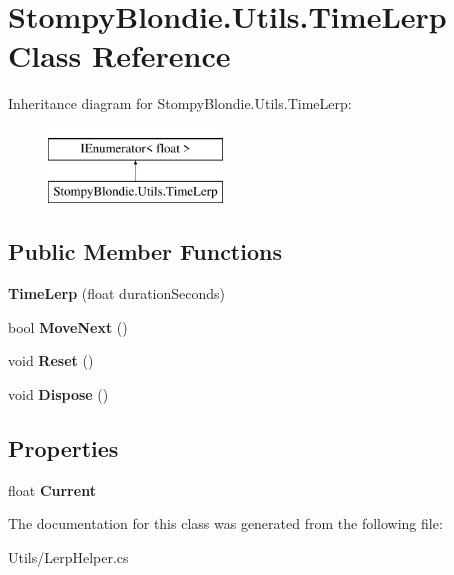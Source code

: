 \hypertarget{class_stompy_blondie_1_1_utils_1_1_time_lerp}{}\section{Stompy\+Blondie.\+Utils.\+Time\+Lerp Class Reference}
\label{class_stompy_blondie_1_1_utils_1_1_time_lerp}
Inheritance diagram for Stompy\+Blondie.\+Utils.\+Time\+Lerp\+:\begin{figure}[H]
\begin{center}
\leavevmode
\includegraphics[height=2.000000cm]{class_stompy_blondie_1_1_utils_1_1_time_lerp}
\end{center}
\end{figure}
\subsection*{Public Member Functions}
\begin{DoxyCompactItemize}
\item 
\mbox{\label{class_stompy_blondie_1_1_utils_1_1_time_lerp_a29f7e8faa0c774f1be10d5d75f021abb}} 
{\bfseries Time\+Lerp} (float duration\+Seconds)
\item 
\mbox{\label{class_stompy_blondie_1_1_utils_1_1_time_lerp_a2919d12fff90522ccbe3d24ade54c6b8}} 
bool {\bfseries Move\+Next} ()
\item 
\mbox{\label{class_stompy_blondie_1_1_utils_1_1_time_lerp_a471266f48a72cf51013cc9333b026076}} 
void {\bfseries Reset} ()
\item 
\mbox{\label{class_stompy_blondie_1_1_utils_1_1_time_lerp_a927abfb7ac2193812d8ffb4d557dec3c}} 
void {\bfseries Dispose} ()
\end{DoxyCompactItemize}
\subsection*{Properties}
\begin{DoxyCompactItemize}
\item 
\mbox{\label{class_stompy_blondie_1_1_utils_1_1_time_lerp_a1caee886c2d6305e949dfa241553432f}} 
float {\bfseries Current}
\end{DoxyCompactItemize}


The documentation for this class was generated from the following file\+:\begin{DoxyCompactItemize}
\item 
Utils/Lerp\+Helper.\+cs\end{DoxyCompactItemize}
